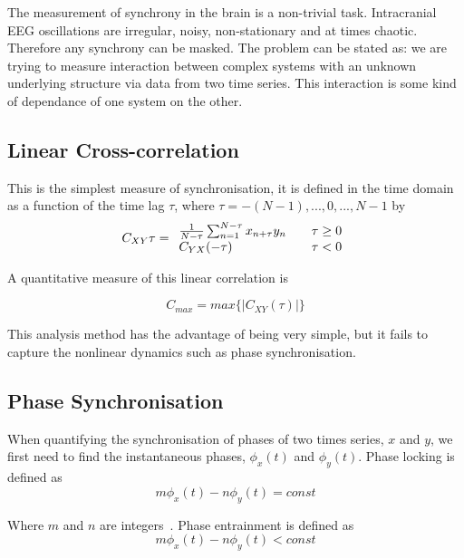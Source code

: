 \documentclass[]{article}
\begin{document}
The measurement of synchrony in the brain is a non-trivial task.
Intracranial EEG oscillations are irregular, noisy, non-stationary
and at times chaotic. Therefore any synchrony can be masked. The
problem can be stated as: we are trying to measure interaction
between complex systems with an unknown underlying structure via
data from two time series. This interaction is some kind of
dependance of one system on the other.\\


\subsection{Linear Cross-correlation}
This is the simplest measure of synchronisation, it is defined in
the time domain as a function of the time lag $\tau$, where $\tau =
-(N-1),...,0,...,N-1$ by
\begin{equation}
C_{XY}{\tau} = \begin{array}{l l}
  \frac{1}{N-\tau}\sum_{n=1}^{N-\tau}x_{n+\tau}y_n & \quad \tau \geq 0\\
  C_{YX}(-\tau) & \quad \tau <0\\ \end{array}
\end{equation}

A quantitative measure of this linear correlation is

\begin{equation}
C_{max} = max\{|C_{XY}(\tau)|\}
\end{equation}

This analysis method has the advantage of being very simple, but it
fails to capture the nonlinear dynamics such as phase
synchronisation.

\subsection{Phase Synchronisation}

When quantifying the synchronisation of phases of two times series,
$x$ and $y$, we first need to find the instantaneous phases,
$\phi_x(t)$ and $\phi_y(t)$. Phase locking is defined as
\begin{equation}
m\phi_x(t)-n\phi_y(t) = const
\end{equation}

Where $m$ and $n$ are integers~\cite{Huygens1673}. Phase
entrainment is defined as
\begin{equation}
m\phi_x(t)-n\phi_y(t) < const
\end{equation}
\end{document}
